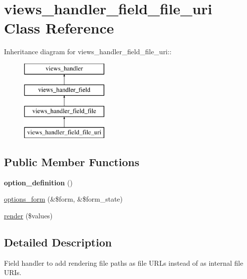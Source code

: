 \hypertarget{classviews__handler__field__file__uri}{
\section{views\_\-handler\_\-field\_\-file\_\-uri Class Reference}
\label{classviews__handler__field__file__uri}
}
Inheritance diagram for views\_\-handler\_\-field\_\-file\_\-uri::\begin{figure}[H]
\begin{center}
\leavevmode
\includegraphics[height=4cm]{classviews__handler__field__file__uri}
\end{center}
\end{figure}
\subsection*{Public Member Functions}
\begin{DoxyCompactItemize}
\item 
\hypertarget{classviews__handler__field__file__uri_af9430c09324ed84dacae33fb0b0f0f8f}{
{\bfseries option\_\-definition} ()}
\label{classviews__handler__field__file__uri_af9430c09324ed84dacae33fb0b0f0f8f}

\item 
\hyperlink{classviews__handler__field__file__uri_aef98f71a75b7285bcb2dc6c7ddaebc55}{options\_\-form} (\&\$form, \&\$form\_\-state)
\item 
\hyperlink{classviews__handler__field__file__uri_af0c5416bd2f6c9c2e3cd1b73f7bf1c0f}{render} (\$values)
\end{DoxyCompactItemize}


\subsection{Detailed Description}
Field handler to add rendering file paths as file URLs instead of as internal file URIs. 

